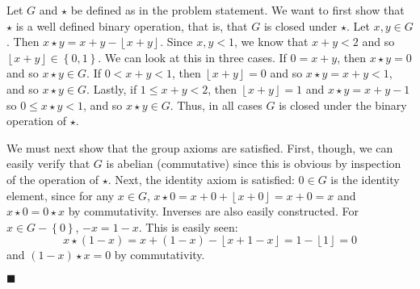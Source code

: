 \documentclass[12pt]{article}
\renewcommand{\qed}{\hfill$\blacksquare$}
\renewenvironment{proof}{\begin{addmargin}[1em]{0em}\begin{newproof}}{\end{newproof}\end{addmargin}\qed}
\begin{document}
\begin{proof}
Let $G$ and $\star$ be defined as in the problem statement. We want to first show that $\star$ is a well defined binary operation, that is, that $G$ is closed under $\star$. Let $x,y \in G$. Then $x\star y = x + y - \left\lfloor x+y\right\rfloor $. Since $x,y < 1$, we know that $x+y < 2$ and so $\left\lfloor x+y\right\rfloor \in \left\{0,1\right\}$. We can look at this in three cases. If $0=x+y$, then $x\star y = 0$ and so $x\star y \in G$. If $0< x+y < 1$, then $\left\lfloor x+y\right\rfloor = 0$ and so $x\star y = x+y < 1$, and so $x\star y \in G$. Lastly, if $1\leq x+y < 2$, then $\left\lfloor x+y \right\rfloor = 1$ and $x\star y = x+y-1$ so $0\leq x\star y < 1$, and so $x\star y \in G$. Thus, in all cases $G$ is closed under the binary operation of $\star$.

We must next show that the group axioms are satisfied. First, though, we can easily verify that $G$ is abelian (commutative) since this is obvious by inspection of the operation of $\star$. Next, the identity axiom is satisfied: $0 \in G$ is the identity element, since for any $x\in G$, $x\star 0 = x+0+\left\lfloor x+0\right\rfloor = x + 0 = x $ and $x\star 0 = 0\star x$ by commutativity. Inverses are also easily constructed. For $x \in G-\left\{0\right\}$, $-x = 1-x$. This is easily seen:
$$ x\star \left(1-x\right) = x + \left(1-x\right) - \left\lfloor x+ 1-x\right\rfloor = 1 - \left\lfloor 1 \right\rfloor = 0 $$
and $\left(1-x\right)\star x = 0$ by commutativity.


\end{proof}
\end{document}
